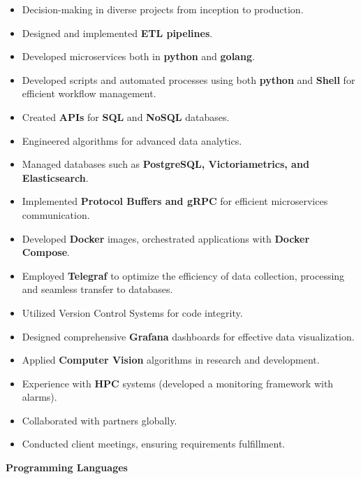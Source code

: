 \documentclass[10pt,a4paper,ragged2e,withhyper]{altacv}
\begin{document}
\begin{paracol}{2}
  \begin{itemize}
    \item Decision-making in diverse projects from inception to production.
    \item Designed and implemented \textbf{ETL pipelines}.
    \item  Developed microservices both in \textbf{python} and \textbf{golang}.
    \item Developed scripts and automated processes using both  \textbf{python} and \textbf{Shell} for efficient workflow management.
    \item Created \textbf{APIs} for \textbf{SQL} and \textbf{NoSQL} databases.
    \item Engineered algorithms for advanced data analytics.
    \item Managed databases such as \textbf{PostgreSQL, Victoriametrics, and Elasticsearch}.
    \item Implemented \textbf{Protocol Buffers and gRPC} for efficient microservices communication.
    \item Developed \textbf{Docker} images, orchestrated applications with \textbf{Docker Compose}.
    \item Employed \textbf{Telegraf} to optimize the efficiency of data collection, processing and seamless transfer to databases.
    \item Utilized Version Control Systems for code integrity.
    \item Designed comprehensive \textbf{Grafana} dashboards for effective data visualization.
    \item Applied \textbf{Computer Vision} algorithms in research and development. 
    \item Experience with \textbf{HPC} systems (developed a monitoring framework with alarms).
    \item Collaborated with partners globally.
    \item Conducted client meetings, ensuring requirements fulfillment.

    
\end{itemize}




\switchcolumn





\textbf{Programming Languages} \\
\smallskip
{}
\\


\end{paracol}
\end{document}
